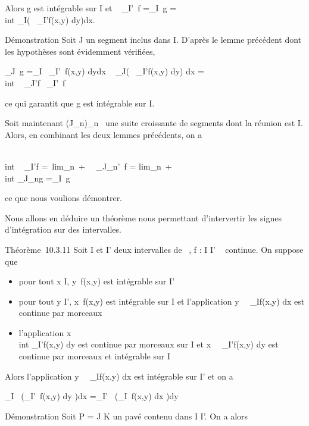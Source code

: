 \documentclass[]{article}
\begin{document}
Alors g est intégrable sur I et \int ~
\int  _I\timesI'~f
=\int  _I~g =\\int
 _I\left (\int ~
_I'f(x,y) dy\right )dx.

Démonstration Soit J un segment inclus dans I. D'après le lemme
précédent dont les hypothèses sont évidemment vérifiées,

\int  _J~g
=\int  _I~\left
\int  _I'~f(x,y)
dy\right  dx \leq\int ~
_J\left (\int ~
_I'f(x,y) dy\right ) dx
=\int  \\int ~
_J\timesI'f\leq\int ~
\int  _I\timesI'~f

ce qui garantit que g est intégrable sur I.

Soit maintenant (J_n)_n\in{}~ une suite croissante de
segments dont la réunion est I. Alors, en combinant les deux lemmes
précédents, on a

\int  \\int ~
_I\timesI'f =\
lim_n\rightarrow~+\infty~\int ~
\int  _J_n\timesI'~f
= lim_n\rightarrow~+\infty~~\\int
 _J_ng =\int  _I~g

ce que nous voulions démontrer.

Nous allons en déduire un théorème nous permettant d'intervertir les
signes d'intégration sur des intervalles.

Théorème~10.3.11 Soit I et I' deux intervalles de ~, f : I \times I' \rightarrow~ 
continue. On suppose que

\begin{itemize}
\itemsep1pt\parskip0pt
\item
  pour tout x \in I, y\mapsto~f(x,y) est intégrable
  sur I'
\item
  pour tout y \in I', x\mapsto~f(x,y) est intégrable
  sur I et l'application
  y\mapsto~\int ~
  _If(x,y) dx est continue par morceaux
\item
  l'application x\mapsto~\\int
   _I'f(x,y) dy est continue par morceaux sur I et
  x\mapsto~\int ~
  _I'f(x,y) dy est continue par morceaux et
  intégrable sur I
\end{itemize}

Alors l'application
y\mapsto~\int ~
_If(x,y) dx est intégrable sur I' et on a

\int  _I~\left
(\int  _I'~f(x,y) dy\right
)dx =\int  _I'~\left
(\int  _I~f(x,y) dx\right
)dy

Démonstration Soit P = J \times K un pavé contenu dans I \times I'. On a alors
\end{document}
